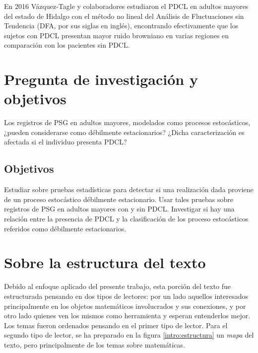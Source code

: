 \documentclass[12pt,letterpaper,draft]{book}
\begin{document}
En 2016 Vázquez-Tagle y colaboradores estudiaron el PDCL en adultos mayores del estado de Hidalgo con el método no lineal del Análisis de Fluctuaciones sin Tendencia (DFA, por sus siglas en inglés), encontrando efectivamente que los sujetos con PDCL presentan mayor ruido browniano en varias regiones en comparación con los pacientes sin PDCL\cite{VazquezTagle16}.


\section*{Pregunta de investigación y objetivos}

Los registros de PSG en adultos mayores, modelados como procesos estocásticos, ¿pueden considerarse como débilmente estacionarios?
%
¿Dicha caracterización es afectada si el individuo presenta PDCL?


\subsection*{Objetivos}

Estudiar sobre pruebas estadísticas para detectar si una realización dada proviene de un proceso estocástico débilmente estacionario.
%
Usar tales pruebas sobre registros de PSG en adultos mayores con y sin PDCL.
%
Investigar si hay una relación entre la presencia de PDCL y la clasificación de los proceso estocásticos referidos como débilmente estacionarios.

\section*{Sobre la estructura del texto}

Debido al enfoque aplicado del presente trabajo, esta porción del texto fue estructurada pensando en dos tipos de lectores: por un lado aquellos interesados principalmente en los objetos matemáticos involucrados y sus conexiones, y por otro lado quienes ven los mismos como herramienta y esperan entenderlos mejor.
%
Los temas fueron ordenados pensando en el primer tipo de lector.
%
Para el segundo tipo de lector, se ha preparado en la figura \ref{intro:estructura} un \textit{mapa} del texto, pero principalmente de los temas sobre matemáticas.
\end{document}
